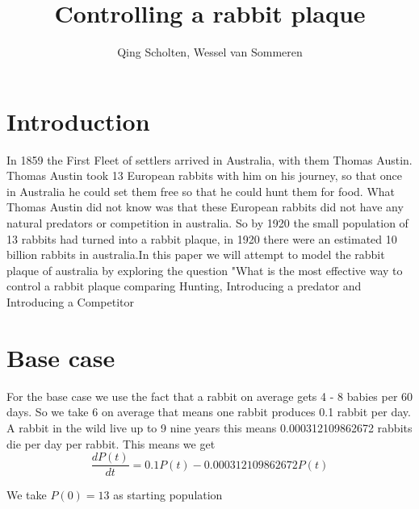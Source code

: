 \documentclass{article}
\author{Qing Scholten, Wessel van Sommeren}
\title{Controlling a rabbit plaque}
\begin{document}
\maketitle
\newpage
\tableofcontents
\newpage

\section{Introduction}
In 1859 the First Fleet of settlers arrived in Australia, with them Thomas Austin. Thomas Austin took 13 European rabbits with him on his journey, so that once in Australia he could set them free so that he could hunt them for food. What Thomas Austin did not know was that these European rabbits did not have any natural predators or competition in australia. So by 1920 the small population of 13 rabbits had turned into a rabbit plaque, in 1920 there were an estimated 10 billion rabbits in australia.In this paper we will attempt to model the rabbit plaque of australia by exploring the question "What is the most effective way to control a rabbit plaque comparing Hunting, Introducing a predator and Introducing a Competitor 
\section{Base case}
For the base case we use the fact that a rabbit on average gets 4 - 8 babies per 60 days. So we take 6 on average that means one rabbit produces 0.1 rabbit per day. A rabbit in the wild live up to 9 nine years this means 0.000312109862672 rabbits die per day per rabbit. This means we get 
$$
\frac{dP(t)}{dt} = 0.1P(t)-0.000312109862672P(t)
$$

We take $P(0) = 13$ as starting population
\\
\end{document}
